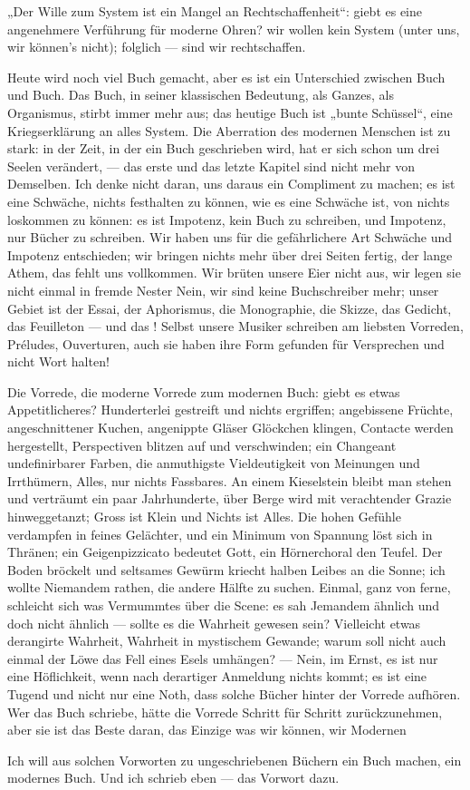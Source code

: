 \PrefaceStart
{}
„Der Wille zum System ist ein Mangel an Rechtschaffenheit“: giebt es eine angenehmere Verführung für moderne Ohren? wir wollen kein System (unter uns, wir können’s nicht); folglich — sind wir rechtschaffen.
\par

Heute wird noch viel Buch gemacht, aber es ist ein Unterschied zwischen Buch und Buch. Das Buch, in seiner klassischen Bedeutung, als Ganzes, als Organismus, stirbt immer mehr aus; das heutige Buch ist  „bunte Schüssel“, eine Kriegserklärung an alles System. Die Aberration des modernen Menschen ist zu stark: in der Zeit, in der ein Buch geschrieben wird, hat er sich schon um drei Seelen verändert, — das erste und das letzte Kapitel sind nicht mehr von Demselben. Ich denke nicht daran, uns daraus ein Compliment zu machen; es ist eine Schwäche, nichts festhalten zu können, wie es eine Schwäche ist, von nichts loskommen zu können: es ist Impotenz, kein Buch zu schreiben, und Impotenz, nur Bücher zu schreiben. Wir haben uns für die gefährlichere Art Schwäche und Impotenz entschieden; wir bringen nichts mehr über drei Seiten fertig, der lange Athem, das  fehlt uns vollkommen. Wir brüten unsere Eier nicht aus, wir legen sie nicht einmal in fremde Nester Nein, wir sind keine Buchschreiber mehr; unser Gebiet ist der Essai, der Aphorismus, die Monographie, die Skizze, das Gedicht, das Feuilleton — und das ! Selbst unsere Musiker schreiben am liebsten Vorreden, Préludes, Ouverturen, auch sie haben ihre Form gefunden für Versprechen und nicht Wort halten!
\par

Die Vorrede, die moderne Vorrede zum modernen Buch: giebt es etwas Appetitlicheres? Hunderterlei gestreift und nichts ergriffen; angebissene Früchte, angeschnittener Kuchen, angenippte Gläser Glöckchen klingen, Contacte werden hergestellt, Perspectiven blitzen auf und verschwinden; ein Changeant undefinirbarer Farben, die anmuthigste Vieldeutigkeit von Meinungen und Irrthümern, Alles, nur nichts Fassbares. An einem Kieselstein bleibt man stehen und verträumt ein paar Jahrhunderte, über Berge wird mit verachtender Grazie hinweggetanzt; Gross ist Klein und Nichts ist Alles. Die hohen Gefühle verdampfen in feines Gelächter, und ein Minimum von Spannung löst sich in Thränen; ein Geigenpizzicato bedeutet Gott, ein Hörnerchoral den Teufel. Der Boden bröckelt und seltsames Gewürm kriecht halben Leibes an die Sonne; ich wollte Niemandem rathen, die andere Hälfte zu suchen. Einmal, ganz von ferne, schleicht sich was Vermummtes über die Scene: es sah Jemandem ähnlich und doch nicht ähnlich — sollte es die Wahrheit gewesen sein? Vielleicht etwas derangirte Wahrheit, Wahrheit in mystischem Gewande; warum soll nicht auch einmal der Löwe das Fell eines Esels umhängen? — Nein, im Ernst, es ist nur eine Höflichkeit, wenn nach derartiger Anmeldung nichts kommt; es ist eine Tugend und nicht nur eine Noth, dass solche Bücher hinter der Vorrede aufhören. Wer das Buch schriebe, hätte die Vorrede Schritt für Schritt zurückzunehmen, aber sie ist das Beste daran, das Einzige was wir können, wir Modernen
\par

Ich will aus solchen Vorworten zu ungeschriebenen Büchern ein Buch machen, ein modernes Buch. Und ich schrieb eben — das Vorwort dazu.
\par


